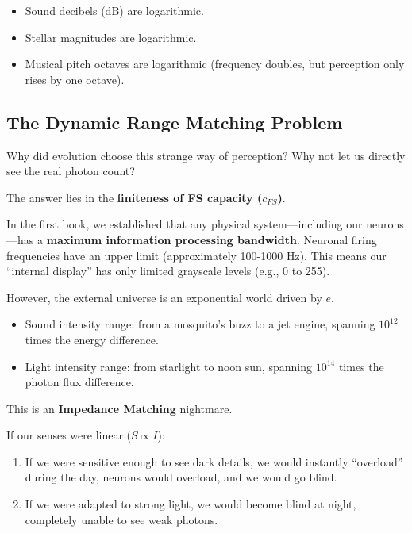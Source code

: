 \begin{itemize}
\item Sound decibels (dB) are logarithmic.

\item Stellar magnitudes are logarithmic.

\item Musical pitch octaves are logarithmic (frequency doubles, but perception only rises by one octave).
\end{itemize}

\subsection{The Dynamic Range Matching Problem}

Why did evolution choose this strange way of perception? Why not let us directly see the real photon count?

The answer lies in the \textbf{finiteness of FS capacity ($c_{FS}$)}.

In the first book, we established that any physical system---including our neurons---has a \textbf{maximum information processing bandwidth}. Neuronal firing frequencies have an upper limit (approximately 100-1000 Hz). This means our ``internal display'' has only limited grayscale levels (e.g., 0 to 255).

However, the external universe is an exponential world driven by \textbf{$e$}.

\begin{itemize}
\item Sound intensity range: from a mosquito's buzz to a jet engine, spanning $10^{12}$ times the energy difference.

\item Light intensity range: from starlight to noon sun, spanning $10^{14}$ times the photon flux difference.
\end{itemize}

This is an \textbf{Impedance Matching} nightmare.

If our senses were linear ($S \propto I$):

\begin{enumerate}
\item If we were sensitive enough to see dark details, we would instantly ``overload'' during the day, neurons would overload, and we would go blind.

\item If we were adapted to strong light, we would become blind at night, completely unable to see weak photons.
\end{enumerate}

